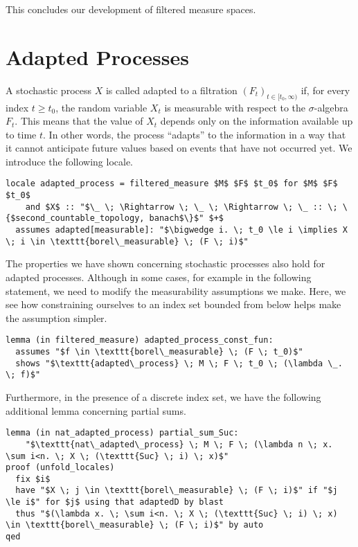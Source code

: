 This concludes our development of filtered measure spaces.

\section{Adapted Processes}

A stochastic process $X$ is called adapted to a filtration $(F_t)_{t \in [t_0, \infty)}$ if, for every index $t \ge t_0$, the random variable $X_t$ is measurable with respect to the $\sigma$-algebra $F_t$. This means that the value of $X_t$ depends only on the information available up to time $t$. In other words, the process ``adapts'' to the information in a way that it cannot anticipate future values based on events that have not occurred yet. We introduce the following locale.

\begin{isalemma}
{\small
\begin{lstlisting}[style=isabelle]
locale adapted_process = filtered_measure $M$ $F$ $t_0$ for $M$ $F$ $t_0$ 
	and $X$ :: "$\_ \; \Rightarrow \; \_ \; \Rightarrow \; \_ :: \; \{$second_countable_topology, banach$\}$" $+$
  assumes adapted[measurable]: "$\bigwedge i. \; t_0 \le i \implies X \; i \in \texttt{borel\_measurable} \; (F \; i)$"
\end{lstlisting}
}
\end{isalemma}

The properties we have shown concerning stochastic processes also hold for adapted processes. Although in some cases, for example in the following statement, we need to modify the measurability assumptions we make. Here, we see how constraining ourselves to an index set bounded from below helps make the assumption simpler.

\begin{isalemma}
{\small
\begin{lstlisting}[style=isabelle]
lemma (in filtered_measure) adapted_process_const_fun:
  assumes "$f \in \texttt{borel\_measurable} \; (F \; t_0)$"
  shows "$\texttt{adapted\_process} \; M \; F \; t_0 \; (\lambda \_. \; f)$"
\end{lstlisting}
}
\end{isalemma}

Furthermore, in the presence of a discrete index set, we have the following additional lemma concerning partial sums.

\begin{isalemma}
{\small
\begin{lstlisting}[style=isabelle]
lemma (in nat_adapted_process) partial_sum_Suc: 
	"$\texttt{nat\_adapted\_process} \; M \; F \; (\lambda n \; x. \sum i<n. \; X \; (\texttt{Suc} \; i) \; x)$" 
proof (unfold_locales)
  fix $i$
  have "$X \; j \in \texttt{borel\_measurable} \; (F \; i)$" if "$j \le i$" for $j$ using that adaptedD by blast
  thus "$(\lambda x. \; \sum i<n. \; X \; (\texttt{Suc} \; i) \; x) \in \texttt{borel\_measurable} \; (F \; i)$" by auto
qed
\end{lstlisting}
}
\end{isalemma}

